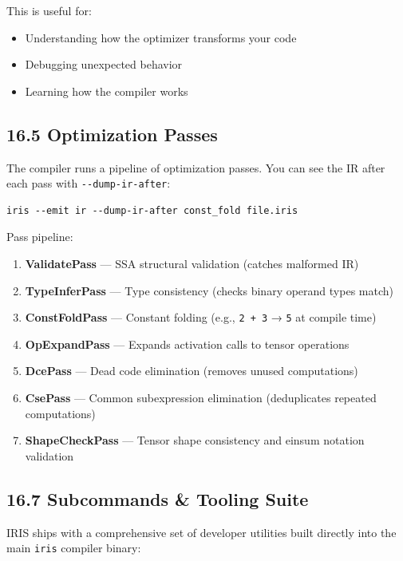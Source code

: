 \documentclass[
  english,
]{book}
\providecommand{\tightlist}{%
  \setlength{\itemsep}{0pt}\setlength{\parskip}{0pt}}
\begin{document}
This is useful for:

\begin{itemize}
\tightlist
\item
  Understanding how the optimizer transforms your code
\item
  Debugging unexpected behavior
\item
  Learning how the compiler works
\end{itemize}

\subsection{16.5 Optimization Passes}\label{optimization-passes}

The compiler runs a pipeline of optimization passes. You can see the IR
after each pass with \texttt{-\/-dump-ir-after}:

\begin{verbatim}
iris --emit ir --dump-ir-after const_fold file.iris
\end{verbatim}

Pass pipeline:

\begin{enumerate}
\def\labelenumi{\arabic{enumi}.}
\tightlist
\item
  \textbf{ValidatePass} --- SSA structural validation (catches malformed
  IR)
\item
  \textbf{TypeInferPass} --- Type consistency (checks binary operand
  types match)
\item
  \textbf{ConstFoldPass} --- Constant folding (e.g., \texttt{2\ +\ 3} →
  \texttt{5} at compile time)
\item
  \textbf{OpExpandPass} --- Expands activation calls to tensor
  operations
\item
  \textbf{DcePass} --- Dead code elimination (removes unused
  computations)
\item
  \textbf{CsePass} --- Common subexpression elimination (deduplicates
  repeated computations)
\item
  \textbf{ShapeCheckPass} --- Tensor shape consistency and einsum
  notation validation
\end{enumerate}

\subsection{16.7 Subcommands \& Tooling
Suite}\label{subcommands-tooling-suite-1}

IRIS ships with a comprehensive set of developer utilities built
directly into the main \texttt{iris} compiler binary:
\end{document}
